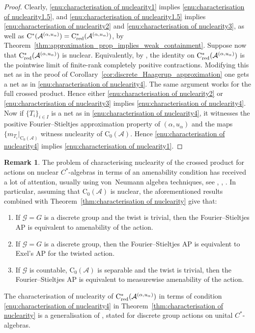 \documentclass[11 pt, leqno]{amsart}
\numberwithin{equation}{section}
\theoremstyle{plain}
\theoremstyle{definition}
\newtheorem {rem} [thm]{Remark}
\newcommand*{\contz}{\mathrm{C_0}}%
\DeclareMathOperator{\red}{red}%
\newcommand{\G}{\mathcal G} %
\newcommand{\A}{\mathcal A}
\newcommand{\cst}{\ifmmode\mathrm{C}^*\else{$\mathrm{C}^*$}\fi}
\begin{document}
\begin{proof} 
Clearly, \ref{enu:characterisation of nuclearity1} implies \ref{enu:characterisation of nuclearity1.5}, and \ref{enu:characterisation of nuclearity1.5} implies \ref{enu:characterisation of nuclearity2} and \ref{enu:characterisation of nuclearity3}, as well as $\cst(\A^{(\alpha,u_\alpha)})=\cst_{\red}(\A^{(\alpha,u_\alpha)})$, by Theorem~\ref{thm:approximation_prop_implies_weak_containment}. 
Suppose now that $\cst_{\red}(\A^{(\alpha,u_\alpha)})$ is nuclear. 
Equivalently, by \cite[Theorem 3.1]{ChoiEffros}, the identity on $\cst_{\red}(\A^{(\alpha,u_\alpha)})$ is the pointwise limit of finite-rank completely positive contractions. 
Modifying this net as in the proof of Corollary~\ref{cor:discrete_Haagerup_approximation} one gets a net as in \ref{enu:characterisation of nuclearity4}. 
The same argument works for the full crossed product.  
Hence either \ref{enu:characterisation of nuclearity2} or \ref{enu:characterisation of nuclearity3} implies \ref{enu:characterisation of nuclearity4}. 
Now if $\{T_i\}_{i\in I}$ is a net as in \ref{enu:characterisation of nuclearity4}, it witnesses the positive Fourier--Stieltjes approximation property of $(\alpha,u_{\alpha})$ and the maps $\{m_{T_i}|_{\contz(\A)}$ witness nuclearity of $\contz(\A)$. 
Hence \ref{enu:characterisation of nuclearity4} implies \ref{enu:characterisation of nuclearity1}. 
\end{proof}

\begin{rem}\label{rem:nuclear_vs_AP's} 
The problem of characterising nuclearity of the crossed product for actions on nuclear $C^*$-algebras in terms of an amenability condition has received a lot of attention, usually using von~Neumann algebra techniques, see \cite[Th\'eor\`eme 4.5]{Clare1}, \cite[Corollary 4.11]{BussEchterhoffWillett}, \cite[Theorem A]{Kranz}. 
In particular, assuming that $\contz(\A)$ is nuclear, the aforementioned results combined with Theorem~\ref{thm:characterisation of nuclearity} give that: 
\begin{enumerate}
    \item If $\G=G$ is a discrete group and the twist is trivial, then the Fourier--Stieltjes AP is equivalent to amenability of the action.
    \item If $\G=G$ is a discrete group, then the Fourier--Stieltjes AP is equivalent to Exel's AP for the twisted action.
    \item If $\G$ is countable, $\contz(\A)$ is separable and the twist is trivial, then the Fourier--Stieltjes AP is equivalent to measurewise amenability of the action.
\end{enumerate}
The characterisation of nuclearity of $\cst_{\red}(\A^{(\alpha,u_\alpha)})$ in terms of condition \ref{enu:characterisation of nuclearity4} in Theorem~\ref{thm:characterisation of nuclearity} is a generalisation of \cite[Theorem 4.3]{mstt}, stated for discrete group actions on unital $C^*$-algebras. 
\end{rem}
 
\end{document}
